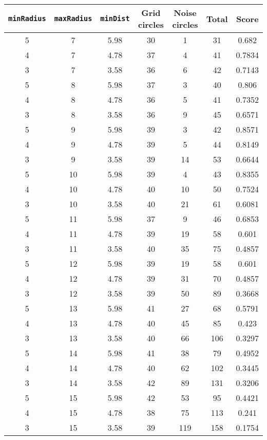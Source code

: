 \documentclass[letterpaper, 12pt]{article}
\begin{document}
\begin{longtable}{|c|c|c|c|c|c|c|}
\hline
\textbf{\texttt{minRadius}} & \textbf{\texttt{maxRadius}} & \textbf{\texttt{minDist}} & \textbf{Grid circles} & \textbf{Noise circles} & \textbf{Total} & \textbf{Score} \\
\hline
5 & 7 & 5.98 & 30 & 1 & 31 & 0.682 \\
\hline
4 & 7 & 4.78 & 37 & 4 & 41 & 0.7834 \\
\hline
3 & 7 & 3.58 & 36 & 6 & 42 & 0.7143 \\
\hline
5 & 8 & 5.98 & 37 & 3 & 40 & 0.806 \\
\hline
4 & 8 & 4.78 & 36 & 5 & 41 & 0.7352 \\
\hline
3 & 8 & 3.58 & 36 & 9 & 45 & 0.6571 \\
\hline
5 & 9 & 5.98 & 39 & 3 & 42 & 0.8571 \\
\hline
4 & 9 & 4.78 & 39 & 5 & 44 & 0.8149 \\
\hline
3 & 9 & 3.58 & 39 & 14 & 53 & 0.6644 \\
\hline
5 & 10 & 5.98 & 39 & 4 & 43 & 0.8355 \\
\hline
4 & 10 & 4.78 & 40 & 10 & 50 & 0.7524 \\
\hline
3 & 10 & 3.58 & 40 & 21 & 61 & 0.6081 \\
\hline
5 & 11 & 5.98 & 37 & 9 & 46 & 0.6853 \\
\hline
4 & 11 & 4.78 & 39 & 19 & 58 & 0.601 \\
\hline
3 & 11 & 3.58 & 40 & 35 & 75 & 0.4857 \\
\hline
5 & 12 & 5.98 & 39 & 19 & 58 & 0.601 \\
\hline
4 & 12 & 4.78 & 39 & 31 & 70 & 0.4857 \\
\hline
3 & 12 & 3.58 & 39 & 50 & 89 & 0.3668 \\
\hline
5 & 13 & 5.98 & 41 & 27 & 68 & 0.5791 \\
\hline
4 & 13 & 4.78 & 40 & 45 & 85 & 0.423 \\
\hline
3 & 13 & 3.58 & 40 & 66 & 106 & 0.3297 \\
\hline
5 & 14 & 5.98 & 41 & 38 & 79 & 0.4952 \\
\hline
4 & 14 & 4.78 & 40 & 62 & 102 & 0.3445 \\
\hline
3 & 14 & 3.58 & 42 & 89 & 131 & 0.3206 \\
\hline
5 & 15 & 5.98 & 42 & 53 & 95 & 0.4421 \\
\hline
4 & 15 & 4.78 & 38 & 75 & 113 & 0.241 \\
\hline
3 & 15 & 3.58 & 39 & 119 & 158 & 0.1754 \\

\end{longtable}
\end{document}
